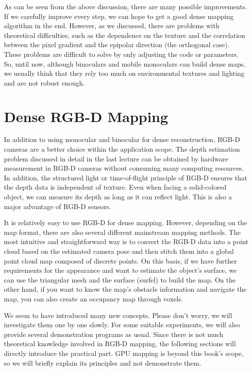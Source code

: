 As can be seen from the above discussion, there are many possible improvements. If we carefully improve every step, we can hope to get a good dense mapping algorithm in the end. However, as we discussed, there are problems with theoretical difficulties, such as the dependence on the texture and the correlation between the pixel gradient and the epipolar direction (the orthogonal case). These problems are difficult to solve by only adjusting the code or parameters. So, until now, although binoculars and mobile monoculars can build dense maps, we usually think that they rely too much on environmental textures and lighting and are not robust enough.

\section{Dense RGB-D Mapping}
In addition to using monocular and binocular for dense reconstruction, RGB-D cameras are a better choice within the application scope. The depth estimation problem discussed in detail in the last lecture can be obtained by hardware measurement in RGB-D cameras without consuming many computing resources. In addition, the structured light or time-of-flight principle of RGB-D ensures that the depth data is independent of texture. Even when facing a solid-colored object, we can measure its depth as long as it can reflect light. This is also a major advantage of RGB-D sensors.

It is relatively easy to use RGB-D for dense mapping. However, depending on the map format, there are also several different mainstream mapping methods. The most intuitive and straightforward way is to convert the RGB-D data into a point cloud based on the estimated camera pose and then stitch them into a global point cloud map composed of discrete points. On this basis, if we have further requirements for the appearance and want to estimate the object's surface, we can use the triangular mesh and the surface (surfel) to build the map. On the other hand, if you want to know the map's obstacle information and navigate the map, you can also create an occupancy map through voxels.

We seem to have introduced many new concepts. Please don't worry, we will investigate them one by one slowly. For some suitable experiments, we will also provide several demonstration programs as usual. Since there is not much theoretical knowledge involved in RGB-D mapping, the following sections will directly introduce the practical part. GPU mapping is beyond this book's scope, so we will briefly explain its principles and not demonstrate them.

